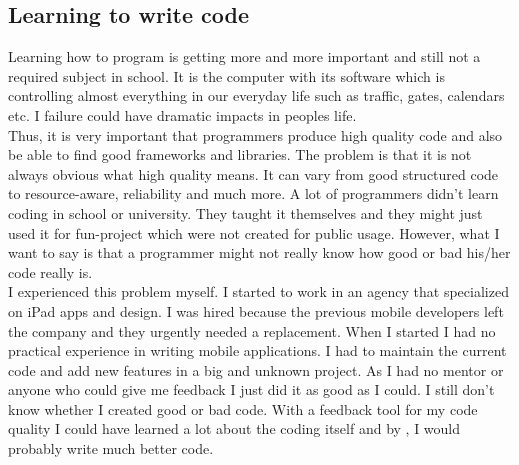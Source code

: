 \subsection{Learning to write code}
Learning how to program is getting more and more important and still not a required subject in school. It is the computer with its software which is controlling almost everything in our everyday life such as traffic, gates, calendars etc. I failure could have dramatic impacts in peoples life.\\
Thus, it is very important that programmers produce high quality code and also be able to find good frameworks and libraries. The problem is that it is not always obvious what high quality means. It can vary from good structured code to resource-aware, reliability and much more. A lot of programmers didn't learn coding in school or university. They taught it themselves and they might just used it for fun-project which were not created for public usage. However, what I want to say is that a programmer might not really know how good or bad his/her code really is.\\
I experienced this problem myself.
I started to work in an agency that specialized on iPad apps and design. I was hired because the previous mobile developers left the company and they urgently needed a replacement. When I started I had no practical experience in writing mobile applications. I had to maintain the current code and add new features in a big and unknown project. As I had no mentor or anyone who could give me feedback I just did it as good as I could. I still don't know whether I created good or bad code. With a feedback tool for my code quality I could have learned a lot about the coding itself and by , I would probably write much better code.

